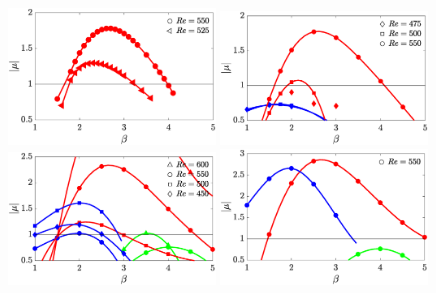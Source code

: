 \documentclass[onecolumn,notitlepage,superscriptaddress, amsmath,amssymb,longbibliographyaps,floatfix]{revtex4-1}
\begin{document}


\begin{figure}
  \centering
%  
%  
%    
%  
  \includegraphics[width=0.49\textwidth]{./fig/AR5s/multipliers_AR5.eps}
  \includegraphics[width=0.49\textwidth]{./fig/AR5s/multipliers_AR5p25.eps}  
  \includegraphics[width=0.49\textwidth]{./fig/AR5s/multipliers_AR5p5.eps}  
  \includegraphics[width=0.49\textwidth]{./fig/AR5s/multipliers_AR5p75.eps}      
  \vspace{0.1cm}
\end{figure}
\end{document}
